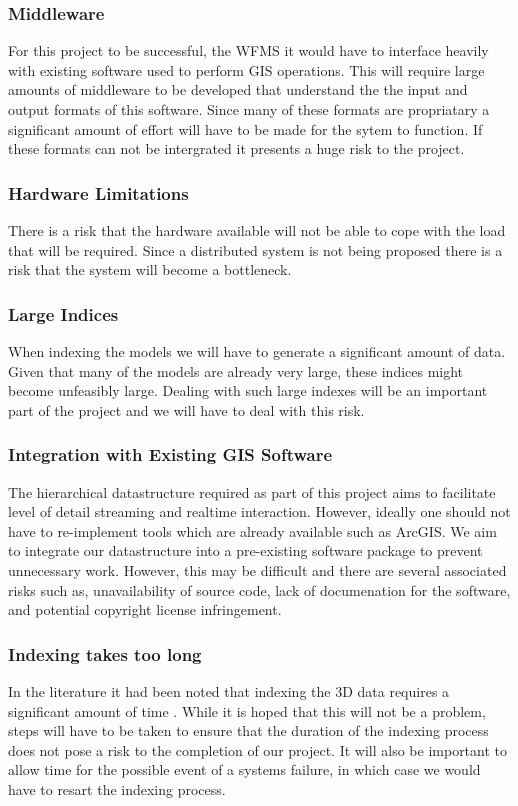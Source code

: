 \documentclass[12pt,a4paper]{article}
\begin{document}
\subsubsection*{Middleware}
For this project to be successful, the WFMS it would have to interface
heavily with existing software used to perform GIS operations. This will
require large amounts of middleware to be developed that understand the
the input and output formats of this software. Since many of these
formats are propriatary a significant amount of effort will have to
be made for the sytem to function. If these formats can not be intergrated
it presents a huge risk to the project.
\subsubsection*{Hardware Limitations}
There is a risk that the hardware available will not be able to cope
with the load that will be required. Since a distributed system is
not being proposed there is a risk that the system will become a bottleneck.
\subsubsection*{Large Indices}
When indexing the models we will have to generate a significant amount of data. Given that many of the models are already very large, these indices might become unfeasibly large. Dealing with such large indexes will be an important part of the project and we will have to deal with this risk.
\subsubsection*{Integration with Existing GIS Software}
The hierarchical datastructure required as part of this project aims to facilitate level of detail streaming and realtime interaction. However, ideally one should not have to re-implement tools which are already available such as ArcGIS. We aim to integrate our datastructure into a pre-existing software package to prevent unnecessary work. However, this may be difficult and there are several associated risks such as, unavailability of source code, lack of documenation for the software, and potential copyright license infringement.
\subsubsection*{Indexing takes too long}
In the literature it had been noted that indexing the 3D data requires a significant amount of time \cite{interactivepointclouds}. While it is hoped that this will not be a problem, steps will have to be taken to ensure that the duration of the indexing process does not pose a risk to the completion of our project. It will also be important to allow time for the possible event of a systems failure, in which case we would have to resart the indexing process.
\end{document}
